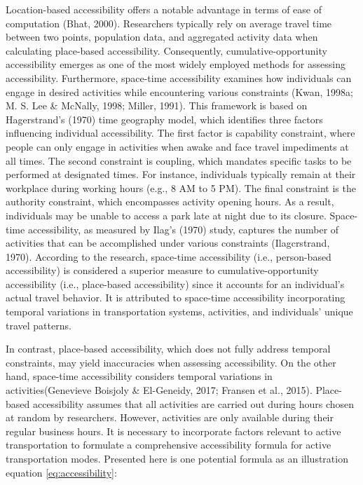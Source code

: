 \documentclass[
11pt, %
oneside, %
english, %
singlespacing, %
]{macthesis} %
\begin{document}
Location-based accessibility offers a notable advantage in terms of ease of computation (Bhat, 2000). Researchers typically rely on average travel time between two points, population data, and aggregated activity data when calculating place-based accessibility. Consequently, cumulative-opportunity accessibility emerges as one of the most widely employed methods for assessing accessibility. Furthermore, space-time accessibility examines how individuals can engage in desired activities while encountering various constraints (Kwan, 1998a; M. S. Lee \& McNally, 1998; Miller, 1991). This framework is based on Hagerstrand's (1970) time geography model, which identifies three factors influencing individual accessibility. The first factor is capability constraint, where people can only engage in activities when awake and face travel impediments at all times. The second constraint is coupling, which mandates specific tasks to be performed at designated times. For instance, individuals typically remain at their workplace during working hours (e.g., 8 AM to 5 PM). The final constraint is the authority constraint, which encompasses activity opening hours. As a result, individuals may be unable to access a park late at night due to its closure. Space-time accessibility, as measured by Ilag's (1970) study, captures the number of activities that can be accomplished under various constraints (Ilagcrstrand, 1970). According to the research, space-time accessibility (i.e., person-based accessibility) is considered a superior measure to cumulative-opportunity accessibility (i.e., place-based accessibility) since it accounts for an individual's actual travel behavior. It is attributed to space-time accessibility incorporating temporal variations in transportation systems, activities, and individuals' unique travel patterns.

In contrast, place-based accessibility, which does not fully address temporal constraints, may yield inaccuracies when assessing accessibility. On the other hand, space-time accessibility considers temporal variations in activities(Genevieve Boisjoly \& El-Geneidy, 2017; Fransen et al., 2015). Place-based accessibility assumes that all activities are carried out during hours chosen at random by researchers. However, activities are only available during their regular business hours. It is necessary to incorporate factors relevant to active transportation to formulate a comprehensive accessibility formula for active transportation modes. Presented here is one potential formula as an illustration equation \ref{eq:accessibility}:
\end{document}
